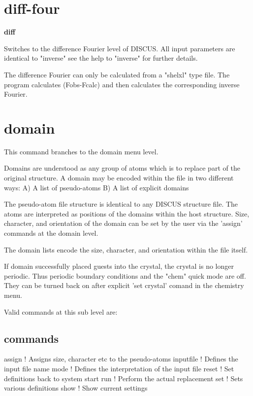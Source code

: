 \section{diff-four}
{\bf diff \par }
\par
\vspace{3pt}
Switches to the difference Fourier level of DISCUS. 
All input parameters are identical to "inverse" see the help to 
"inverse" for further details. 
\par
The difference Fourier can only be calculated from a "shelxl" type 
file. The program calculates (Fobs-Fcalc) and then calculates the 
corresponding inverse Fourier. 
\section{domain}
\par
This command branches to the domain menu level. 
\par
Domains are understood as any group of atoms which is to replace 
part of the original structure. A domain may be encoded within the 
file in two different ways: 
A) A list of pseudo-atoms 
B) A list of explicit domains 
\par
The pseudo-atom file structure is identical to any DISCUS structure 
file. The atoms are interpreted as positions of the domains within 
the host structure. Size, character, and orientation of the domain 
can be set by the user via the 'assign' commands at the domain level. 
\par
The domain lists encode the size, character, and orientation within 
the file itself. 
\par
If domain successfully placed guests into the crystal, the crystal 
is no longer periodic. Thus periodic boundary conditions and 
the "chem" quick mode are off. They can be turned back on after 
explicit 'set crystal' comand in the chemistry menu. 
\par
Valid commands at this sub level are: 
\subsection*{commands}
\par
\begin{MacVerbatim}
assign     ! Assigns size, character etc to the pseudo-atoms
inputfile  ! Defines the input file name
mode       ! Defines the interpretation of the input file
reset      ! Set definitions back to system start
run        ! Perform the actual replacement
set        ! Sets various definitions
show       ! Show current settings
\end{MacVerbatim}
